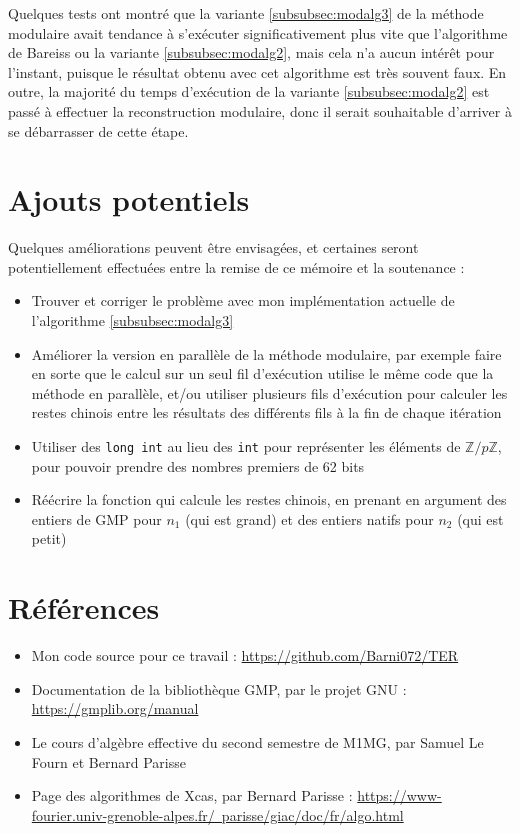 \documentclass[french]{article}
\begin{document}
\par
Quelques tests ont montré que la variante \ref{subsubsec:modalg3} de la méthode modulaire avait tendance à s'exécuter significativement plus vite que l'algorithme de Bareiss ou la variante \ref{subsubsec:modalg2}, mais cela n'a aucun intérêt pour l'instant, puisque le résultat obtenu avec cet algorithme est très souvent faux. En outre, la majorité du temps d'exécution de la variante \ref{subsubsec:modalg2} est passé à effectuer la reconstruction modulaire, donc il serait souhaitable d'arriver à se débarrasser de cette étape.
\section{Ajouts potentiels}
Quelques améliorations peuvent être envisagées, et certaines seront potentiellement effectuées entre la remise de ce mémoire et la soutenance :
\begin{itemize}
	\item Trouver et corriger le problème avec mon implémentation actuelle de l'algorithme \ref{subsubsec:modalg3}
	\item Améliorer la version en parallèle de la méthode modulaire, par exemple faire en sorte que le calcul sur un seul fil d'exécution utilise le même code que la méthode en parallèle, et/ou utiliser plusieurs fils d'exécution pour calculer les restes chinois entre les résultats des différents fils à la fin de chaque itération
	\item Utiliser des {\tt long int} au lieu des {\tt int} pour représenter les éléments de $\mathbb{Z}/p\mathbb{Z}$, pour pouvoir prendre des nombres premiers de 62 bits
	\item Réécrire la fonction qui calcule les restes chinois, en prenant en argument des entiers de GMP pour $n_1$ (qui est grand) et des entiers natifs pour $n_2$ (qui est petit)
\end{itemize}
\section{Références}
\begin{itemize}
	\item Mon code source pour ce travail : \href{https://github.com/Barni072/TER}{https://github.com/Barni072/TER}
	\item Documentation de la bibliothèque GMP, par le projet GNU : \href{https://gmplib.org/manual/}{https://gmplib.org/manual}
	\item Le cours d'algèbre effective du second semestre de M1MG, par Samuel Le Fourn et Bernard Parisse
	\item Page des algorithmes de Xcas, par Bernard Parisse : \href{https://www-fourier.univ-grenoble-alpes.fr/~parisse/giac/doc/fr/algo.html}{https://www-fourier.univ-grenoble-alpes.fr/~parisse/giac/doc/fr/algo.html}
\end{itemize}
\end{document}
